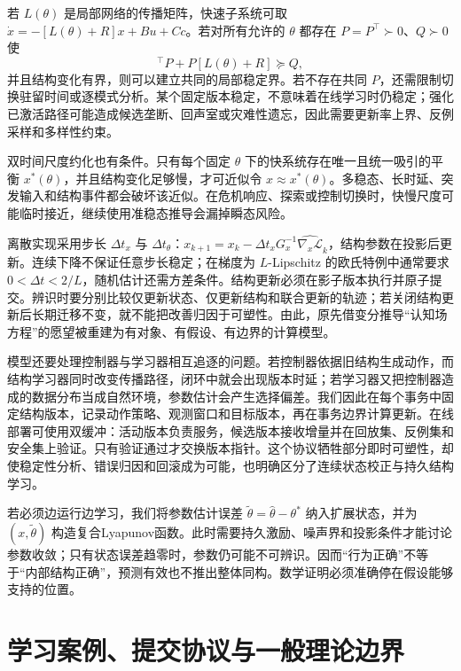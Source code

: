 若 $L(\theta)$ 是局部网络的传播矩阵，快速子系统可取 $\dot x=-[L(\theta)+R]x+Bu+Cc$。若对所有允许的 $\theta$ 都存在 $P=P^\top\succ0$、$Q\succ0$ 使
\begin{equation}
 [L(\theta)+R]^\top P+P[L(\theta)+R]\succeq Q,
\end{equation}
并且结构变化有界，则可以建立共同的局部稳定界。若不存在共同 $P$，还需限制切换驻留时间或逐模式分析。某个固定版本稳定，不意味着在线学习时仍稳定；强化已激活路径可能造成候选垄断、回声室或灾难性遗忘，因此需要更新率上界、反例采样和多样性约束。

双时间尺度约化也有条件。只有每个固定 $\theta$ 下的快系统存在唯一且统一吸引的平衡 $x^*(\theta)$，并且结构变化足够慢，才可近似令 $x\approx x^*(\theta)$。多稳态、长时延、突发输入和结构事件都会破坏该近似。在危机响应、探索或控制切换时，快慢尺度可能临时接近，继续使用准稳态推导会漏掉瞬态风险。

离散实现采用步长 $\Delta t_x$ 与 $\Delta t_\theta$：$x_{k+1}=x_k-\Delta t_xG_x^{-1}\widehat{\nabla_x\mathcal L}_k$，结构参数在投影后更新。连续下降不保证任意步长稳定；在梯度为 $L$-Lipschitz 的欧氏特例中通常要求 $0<\Delta t<2/L$，随机估计还需方差条件。结构更新必须在影子版本执行并原子提交。辨识时要分别比较仅更新状态、仅更新结构和联合更新的轨迹；若关闭结构更新后长期迁移不变，就不能把改善归因于可塑性。由此，原先借变分推导“认知场方程”的愿望被重建为有对象、有假设、有边界的计算模型。

模型还要处理控制器与学习器相互追逐的问题。若控制器依据旧结构生成动作，而结构学习器同时改变传播路径，闭环中就会出现版本时延；若学习器又把控制器造成的数据分布当成自然环境，参数估计会产生选择偏差。我们因此在每个事务中固定结构版本，记录动作策略、观测窗口和目标版本，再在事务边界计算更新。在线部署可使用双缓冲：活动版本负责服务，候选版本接收增量并在回放集、反例集和安全集上验证。只有验证通过才交换版本指针。这个协议牺牲部分即时可塑性，却使稳定性分析、错误归因和回滚成为可能，也明确区分了连续状态校正与持久结构学习。

若必须边运行边学习，我们将参数估计误差 $\tilde\theta=\hat\theta-\theta^*$ 纳入扩展状态，并为 $(x,\tilde\theta)$ 构造复合Lyapunov函数。此时需要持久激励、噪声界和投影条件才能讨论参数收敛；只有状态误差趋零时，参数仍可能不可辨识。因而“行为正确”不等于“内部结构正确”，预测有效也不推出整体同构。数学证明必须准确停在假设能够支持的位置。

\section{学习案例、提交协议与一般理论边界}
\label{sec:section_7984}

